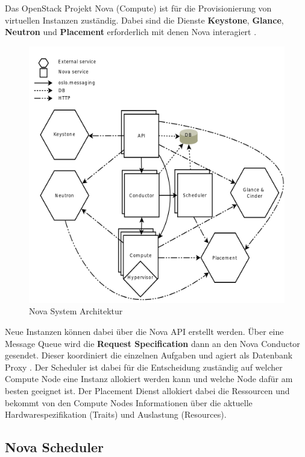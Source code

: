 \documentclass[../Main.tex]{subfiles}
\begin{document}
Das OpenStack Projekt Nova (Compute) ist für die Provisionierung von virtuellen Instanzen zuständig.
Dabei sind die Dienste \textbf{Keystone}, \textbf{Glance}, \textbf{Neutron} und \textbf{Placement} erforderlich
mit denen Nova interagiert \citep{NovaDocs}.

\begin{figure}[h]
    \centering
    \includegraphics[width=0.9\columnwidth]{Images/NovaSystemArchitecture.png}
    \caption{Nova System Architektur \citep{NovaSystemArchitecture}}
\end{figure}

Neue Instanzen können dabei über die Nova API erstellt werden. Über eine Message Queue wird die
\textbf{Request Specification} dann an den Nova Conductor gesendet. Dieser koordiniert die einzelnen
Aufgaben und agiert als Datenbank Proxy \citep{NovaSystemArchitecture}.
Der Scheduler ist dabei für die Entscheidung zuständig auf welcher Compute Node eine Instanz
allokiert werden kann und welche Node dafür am besten geeignet ist. Der Placement Dienst allokiert
dabei die Ressourcen und bekommt von den Compute Nodes Informationen über die aktuelle Hardwarespezifikation (Traits)
und Auslastung (Resources).

\subsection{Nova Scheduler}
\end{document}
